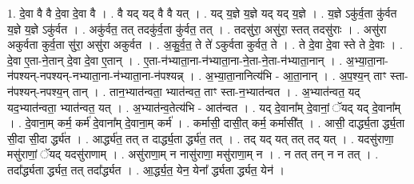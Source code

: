 \documentclass[17pt]{extarticle}
\begin{document}
1. दे॒वा वै वै दे॒वा दे॒वा वै । . वै यद् यद् वै वै यत् । . यद् य॒ज्ञे य॒ज्ञे यद् यद् य॒ज्ञे । . य॒ज्ञे ऽकु॑र्व॒ता कु॑र्वत य॒ज्ञे य॒ज्ञे ऽकु॑र्वत । . अकु॑र्वत॒ तत् तदकु॑र्व॒ता कु॑र्वत॒ तत् । . तदसु॑रा॒ असु॑रा॒ स्तत् तदसु॑राः । . असु॑रा अकुर्वता कुर्व॒ता सु॑रा॒ असु॑रा अकुर्वत । . अ॒कु॒र्व॒त॒ ते ते॑ ऽकुर्वता कुर्वत॒ ते । . ते दे॒वा दे॒वा स्ते ते दे॒वाः । . दे॒वा ए॒ता-ने॒तान् दे॒वा दे॒वा ए॒तान् । . ए॒ता-न॑भ्याता॒ना-न॑भ्याता॒ना-ने॒ता-ने॒ता-न॑भ्याता॒नान् । . अ॒भ्या॒ता॒ना-न॑पश्यन्-नपश्यन्-नभ्याता॒ना-न॑भ्याता॒ना-न॑पश्यन्न् । . अ॒भ्या॒ता॒नानित्य॑भि - आ॒ता॒नान् । . अ॒प॒श्य॒न् ताꣳ स्ता-न॑पश्यन्-नपश्य॒न् तान् । . तान॒भ्यात॑न्वता॒ भ्यात॑न्वत॒ ताꣳ स्ता-न॒भ्यात॑न्वत । . अ॒भ्यात॑न्वत॒ यद् यद॒भ्यात॑न्वता॒ भ्यात॑न्वत॒ यत् । . अ॒भ्यात॑न्व॒तेत्य॑भि - आत॑न्वत । . यद् दे॒वाना᳚म् दे॒वानां॒ ॅयद् यद् दे॒वाना᳚म् । . दे॒वाना॒म् कर्म॒ कर्म॑ दे॒वाना᳚म् दे॒वाना॒म् कर्म॑ । . कर्मासी॒ दासी॒त् कर्म॒ कर्मासी᳚त् । . आसी॒ दार्द्ध्य॒ता र्द्ध्य॒ता सी॒दा सी॒दा र्द्ध्य॑त । . आर्द्ध्य॑त॒ तत् त दार्द्ध्य॒ता र्द्ध्य॑त॒ तत् । . तद् यद् यत् तत् तद् यत् । . यदसु॑राणा॒ मसु॑राणां॒ ॅयद् यदसु॑राणाम् । . असु॑राणा॒म् न नासु॑राणा॒ मसु॑राणा॒म् न । . न तत् तन् न न तत् । . तदा᳚र्द्ध्यता र्द्ध्यत॒ तत् तदा᳚र्द्ध्यत । . आ॒र्द्ध्य॒त॒ येन॒ येना᳚ र्द्ध्यता र्द्ध्यत॒ येन॑ । \newline
\end{document}
